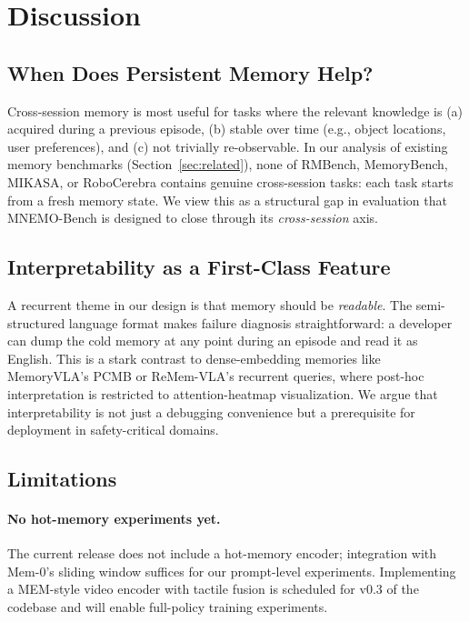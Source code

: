 \section{Discussion}
\label{sec:discussion}

\subsection{When Does Persistent Memory Help?}

Cross-session memory is most useful for tasks where the relevant
knowledge is (a) acquired during a previous episode, (b) stable
over time (e.g., object locations, user preferences), and (c) not
trivially re-observable. In our analysis of existing memory
benchmarks (Section~\ref{sec:related}), none of RMBench,
MemoryBench, MIKASA, or RoboCerebra contains genuine cross-session
tasks: each task starts from a fresh memory state. We view this as a
structural gap in evaluation that MNEMO-Bench is designed to close
through its \emph{cross-session} axis.

\subsection{Interpretability as a First-Class Feature}

A recurrent theme in our design is that memory should be
\emph{readable}. The semi-structured language format makes failure
diagnosis straightforward: a developer can dump the cold memory at
any point during an episode and read it as English. This is a
stark contrast to dense-embedding memories like MemoryVLA's PCMB
or ReMem-VLA's recurrent queries, where post-hoc interpretation is
restricted to attention-heatmap visualization. We argue that
interpretability is not just a debugging convenience but a
prerequisite for deployment in safety-critical domains.

\subsection{Limitations}

\paragraph{No hot-memory experiments yet.}
The current release does not include a hot-memory encoder;
integration with Mem-0's sliding window suffices for our prompt-level
experiments. Implementing a MEM-style video encoder with tactile
fusion is scheduled for v0.3 of the codebase and will enable
full-policy training experiments.

